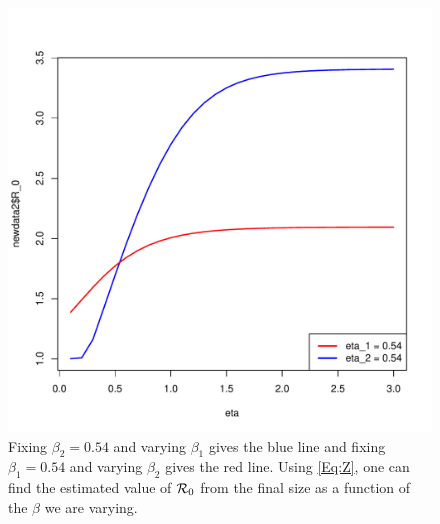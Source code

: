 \documentclass[a4paper, 12pt, journal]{ieeeconf}\usepackage[]{graphicx}\usepackage[]{color}
\begin{document}
\begin{figure}[thpb]
\centering
\includegraphics[scale = 0.44]{figure/R_beta-1.pdf}
\caption{Fixing $\beta_2 = 0.54$ and varying $\beta_1$ gives the blue line and fixing $\beta_1 = 0.54$ and varying $\beta_2$ gives the red line. Using \eqref{Eq:Z}, one can find the estimated value of $\R_0$ from the final size as a function of the $\beta$ we are varying.}\label{F:R_0}
\end{figure}
\end{document}
